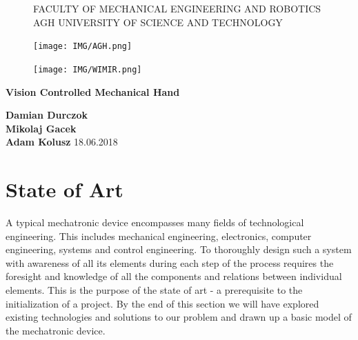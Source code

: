 \documentclass{article}
\begin{document}
\begin{titlepage}
    \begin{center}
        
	\begin{figure}
		\centering
        FACULTY OF MECHANICAL ENGINEERING AND ROBOTICS\\
        AGH UNIVERSITY OF SCIENCE AND TECHNOLOGY\\
        \vspace{0.2cm}
    	\begin{minipage}[b]{0.4\textwidth}
    	    \centering
    		\texttt{[image: IMG/AGH.png]}
    	\end{minipage}
    	\hfill
    	\begin{minipage}[b]{0.4\textwidth}
	    	\centering
    		\texttt{[image: IMG/WIMIR.png]}
		\end{minipage}
		\vspace{1cm}
    \end{figure}

    \Huge \textbf{Vision Controlled Mechanical Hand}
        
    \vspace{0.8cm}
    \LARGE 
    \color{black} 
            
    \vspace{0.8cm}       
    \textbf{Damian Durczok\\Mikolaj Gacek\\Adam Kolusz}        
    \vfill       
    \vspace{0.8cm}    
    18.06.2018
        
    \end{center}
\end{titlepage}

\tableofcontents
\break

\section{State of Art}
A typical mechatronic device encompasses many fields of technological engineering. This includes mechanical engineering, electronics, computer engineering, systems and control engineering. To thoroughly design such a system with awareness of all its elements during each step of the process requires the foresight and knowledge of all the components and relations between individual elements. This is the purpose of the state of art - a prerequisite to the initialization of a project. By the end of this section we will have explored existing technologies and solutions to our problem and drawn up a basic model of the mechatronic device.
\end{document}
